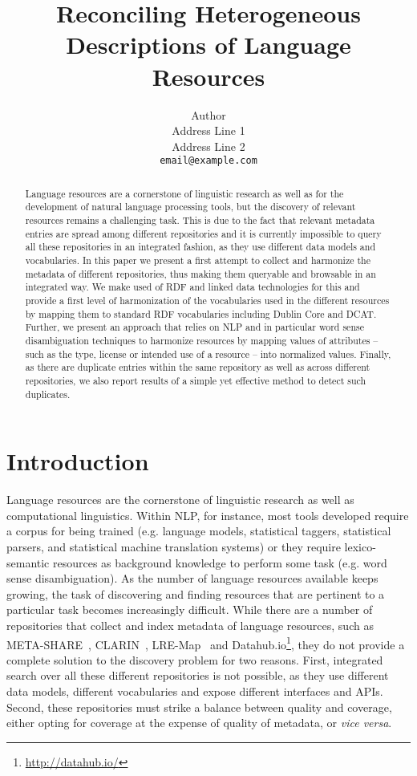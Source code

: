 \documentclass[11pt]{article}
\title{Reconciling Heterogeneous Descriptions of Language Resources}
\author{Author \\
    Address Line 1\\
    Address Line 2\\
{\scriptsize\tt email@example.com}}
\date{}
\begin{document}
\maketitle
\begin{abstract}
	Language resources are a cornerstone of linguistic research as well as for the development of natural language processing tools, 
	but the discovery of relevant resources remains a challenging task.
        This is due to the fact that relevant metadata entries are spread among
        different repositories and it is currently impossible to query all these
        repositories in an integrated fashion, as they use different data
        models and vocabularies. In this paper we present a first attempt to
        collect and harmonize the metadata of different repositories, thus
        making them queryable and browsable in an integrated way. We make used
        of RDF and linked data technologies for this and provide a first level
        of harmonization of the vocabularies used in the different resources by
        mapping them to standard RDF vocabularies including Dublin Core and DCAT. Further, we present an approach that relies on NLP and in particular word sense disambiguation techniques to harmonize resources by mapping values of attributes -- such as the type, license or intended use of a resource -- into normalized values. Finally, as there are duplicate entries within the same repository as well as across different repositories, we also report results of a simple yet effective method to detect such duplicates.
\end{abstract}

\section{Introduction}

Language resources are the cornerstone of linguistic research as well as computational linguistics. Within NLP, for instance, most tools developed require a corpus for being trained (e.g. language models, statistical taggers, statistical parsers, and statistical machine translation systems) or they require lexico-semantic resources as background knowledge to perform some task (e.g. word sense disambiguation). 
As the number of language resources available keeps growing, the task of discovering and finding resources that are pertinent to a particular task becomes increasingly difficult. While there are a number of repositories that collect and index metadata of language resources, such as META-SHARE~\cite{federmann2012meta},
CLARIN~\cite{broeder2010data}, LRE-Map~\cite{calzolari2012lre} and
Datahub.io\footnote{\url{http://datahub.io/}}, they do not provide a complete solution to the discovery problem for two reasons. First, integrated search over all these different repositories is not possible, as they use different data models, different vocabularies and expose different interfaces and APIs. 
Second, these repositories must strike a balance between quality and coverage,
either opting for coverage at the expense of quality of metadata, or \emph{vice
versa}.
\end{document}

